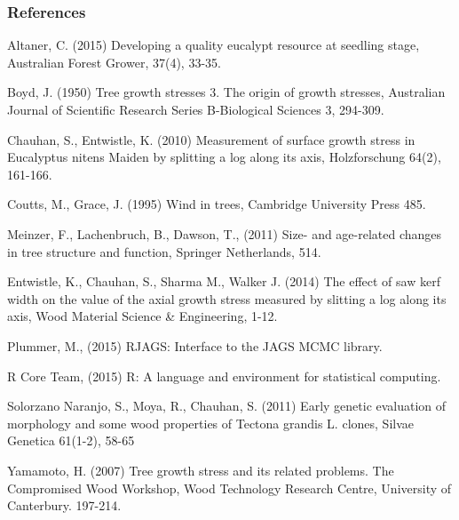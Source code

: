 \subsubsection*{References}

Altaner, C. (2015) Developing a quality eucalypt resource at seedling stage, Australian Forest Grower, 37(4), 33-35. 

Boyd, J. (1950) Tree growth stresses 3. The origin of growth stresses, Australian Journal of Scientific Research Series B-Biological Sciences 3, 294-309.

Chauhan, S., Entwistle, K. (2010) Measurement of surface growth stress in Eucalyptus nitens Maiden by splitting a log along its axis, Holzforschung 64(2), 161-166.

Coutts, M., Grace, J. (1995) Wind in trees, Cambridge University Press 485. 

Meinzer, F., Lachenbruch, B., Dawson, T., (2011) Size- and age-related changes in tree structure and function, Springer Netherlands, 514.

Entwistle, K., Chauhan, S., Sharma M., Walker J. (2014) The effect of saw kerf width on the value of the axial growth stress measured by slitting a log along its axis, Wood Material Science \& Engineering, 1-12.

Plummer, M., (2015) RJAGS: Interface to the JAGS MCMC library. 

R Core Team, (2015) R: A language and environment for statistical computing.

Solorzano Naranjo, S., Moya, R., Chauhan, S. (2011) Early genetic evaluation of morphology and some wood properties of Tectona grandis L. clones, Silvae Genetica 61(1-2), 58-65

Yamamoto, H. (2007) Tree growth stress and its related problems. The Compromised Wood Workshop, Wood Technology Research Centre, University of Canterbury. 197-214.
